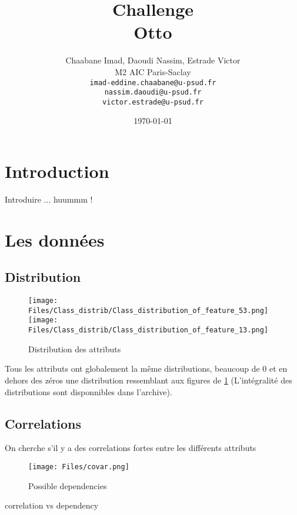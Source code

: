 \documentclass[a4paper, 10pt, twocolomn]{article} %
\title{Challenge\\
	Otto}
\author{Chaabane Imad, Daoudi Nassim, Estrade Victor\\
   M2 AIC Paris-Saclay\\
   \texttt{imad-eddine.chaabane@u-psud.fr}\\
   \texttt{nassim.daoudi@u-psud.fr}\\
   \texttt{victor.estrade@u-psud.fr}\\
        }
\date{\today}
\begin{document}
\maketitle
\tableofcontents
\clearpage


\section*{Introduction} %
\label{sec:introduction}

\todo Introduire ... huummm ! 


\section{Les données} %
\label{sec:les_donn_es}

\subsection{Distribution} %
\label{sub:distribution}

\begin{figure}
 \centering
 \texttt{[image: Files/Class\_distrib/Class\_distribution\_of\_feature\_53.png]}
 \texttt{[image: Files/Class\_distrib/Class\_distribution\_of\_feature\_13.png]}
 \caption[Distribution des attributs]{Distribution des attributs}
 \label{fig: distrib}
\end{figure}

Tous les attributs ont globalement la même distributions, beaucoup de 0 et 
en dehors des zéros une distribution ressemblant aux figures de 
\ref{fig: distrib} (L'intégralité des distributions sont disponnibles dans l'archive).


\subsection{Correlations} %
\label{sub:correlations}

\todo On cherche s'il y a des correlations fortes entre les différents
attributs

\begin{figure}
 \centering
 \texttt{[image: Files/covar.png]}
 \caption[Possible dependencies]{Possible dependencies}
 \label{fig: covar}
\end{figure}

\todo correlation vs dependency
\end{document}
